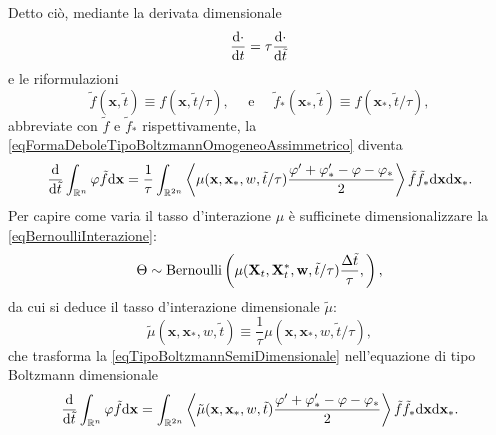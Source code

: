                 Detto ciò, mediante la derivata dimensionale
                \begin{equation*}
                    \frac{\mathrm{d}\cdot}{\mathrm{d}t}=\tau\frac{\mathrm{d}\cdot}{\mathrm{d}\tilde t}
                \end{equation*}
                e le riformulazioni
                \begin{equation*}
                    \tilde f(\mathbf x,\tilde t)\equiv f(\mathbf x,\tilde t/\tau),
                    \quad\text{ e }\quad
                    \tilde f_*(\mathbf x_*,\tilde t)\equiv f(\mathbf x_*,\tilde t/\tau),
                \end{equation*}
                abbreviate con \(\tilde f\) e \(\tilde f_*\) rispettivamente, la \ref{eqFormaDeboleTipoBoltzmannOmogeneoAssimmetrico} diventa
                \begin{equation}
                    \label{eqTipoBoltzmannSemiDimensionale}
                    \frac{\mathrm{d}}{\mathrm{d}\tilde t}\int_{\mathbb R^n}\varphi\tilde f\mathrm{d}\mathbf x=
                    \frac1\tau\int_{\mathbb R^{2n}}\left\langle
                        \mu(\mathbf x,\mathbf x_*,w,\tilde t/\tau)
                            \frac{\varphi'+\varphi'_*-\varphi-\varphi_*}2
                        \right\rangle
                    \tilde f\tilde f_*\mathrm{d}\mathbf x\mathrm{d}\mathbf x_*.
                \end{equation}
                Per capire come varia il tasso d'interazione \(\mu\) è sufficinete dimensionalizzare la \ref{eqBernoulliInterazione}:
                \begin{equation*}
                    \Theta\sim\operatorname{Bernoulli}\left(
                        \mu(\mathbf X_t,\mathbf X^*_t,\mathbf w,\tilde t/\tau)\frac{\Delta\tilde t}\tau,
                    \right),
                \end{equation*}
                da cui si deduce il tasso d'interazione dimensionale \(\tilde\mu\):
                \begin{equation*}
                    \tilde\mu(\mathbf x,\mathbf x_*,w,\tilde t)
                    \equiv\frac1\tau\mu(\mathbf x,\mathbf x_*,w,\tilde t/\tau),
                \end{equation*}
                che trasforma la \cref{eqTipoBoltzmannSemiDimensionale} nell'equazione di tipo Boltzmann dimensionale
                \begin{equation}
                    \label{eqTipoBoltzmannDimensionale}
                    \frac{\mathrm{d}}{\mathrm{d}\tilde t}\int_{\mathbb R^n}\varphi\tilde f\mathrm{d}\mathbf x=
                    \int_{\mathbb R^{2n}}\left\langle
                        \tilde\mu(\mathbf x,\mathbf x_*,w,\tilde t)
                            \frac{\varphi'+\varphi'_*-\varphi-\varphi_*}2
                        \right\rangle
                    \tilde f\tilde f_*\mathrm{d}\mathbf x\mathrm{d}\mathbf x_*.
                \end{equation}

